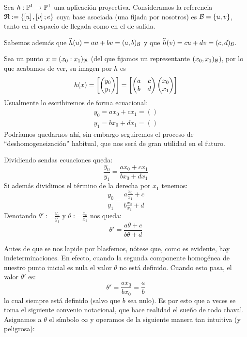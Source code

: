 \begin{exa}
	\label{C4_exa_mobius}
	Sea $h:\mathbb{P}^1\to\mathbb{P}^1$ una aplicación proyectiva. Consideramos la referencia $\mathfrak{R}:=\{\left [ u \right ],\left [ v \right ];e\}$ cuya base asociada (una fijada por nosotros) es $\mathcal{B}=\{u,v\}$, tanto en el espacio de llegada como en el de salida.
	
	Sabemos además que $\widehat{h}(u)=au+bv=(a,b)_{\mathcal{B}}$ y que $\widehat{h}(v)=cu+dv=(c,d)_{\mathcal{B}}$.
	
	Sea un punto $x=(x_0:x_1)_{\mathfrak{R}}$ (del que fijamos un representante $(x_0,x_1)_{\mathcal{B}}$), por lo que acabamos de ver, su imagen por $h$ es
	\[h(x)=\left [ \begin{pmatrix}
		y_0 \\ y_1
		\end{pmatrix} \right ]=\left [ \begin{pmatrix}
	a & c\\
	b & d
	\end{pmatrix}\begin{pmatrix}
	x_0\\
	x_1
	\end{pmatrix} \right ]\]
	Usualmente lo escribiremos de forma ecuacional:
	\[\begin{array}{l}
	y_0 = ax_0+cx_1=()\\
	y_1 = bx_0+dx_1=()
	\end{array}\]
	Podríamos quedarnos ahí, sin embargo seguiremos el proceso de ``deshomogeneización'' habitual, que nos será de gran utilidad en el futuro.
	
	Dividiendo sendas ecuaciones queda:
	\[\frac{y_0}{y_1}=\frac{ax_0+cx_1}{bx_0+dx_1}\]
	Si además dividimos el término de la derecha por $x_1$ tenemos:
	\[\frac{y_0}{y_1}=\frac{a\frac{x_0}{x_1}+c}{b\frac{x_0}{x_1}+d}\]
	Denotando $\theta':=\frac{y_0}{y_1}$ y $\theta:=\frac{x_0}{x_1}$ nos queda:
	\[\theta'=\frac{a\theta+c}{b\theta+d}\]
	
	Antes de que se nos lapide por blasfemos, nótese que, como es evidente, hay indeterminaciones. En efecto, cuando la segunda componente homogénea de nuestro punto inicial es nula el valor $\theta$ no está definido. Cuando esto pasa, el valor $\theta'$ es:
	\[\theta'=\frac{ax_0}{bx_0}=\frac{a}{b}\]
	lo cual siempre está definido (salvo que $b$ sea nulo). Es por esto que a veces se toma el siguiente convenio notacional, que hace realidad el sueño de todo chaval. Asignamos a $\theta$ el símbolo $\infty$ y operamos de la siguiente manera tan intuitiva (y peligrosa):
	

\end{exa}
